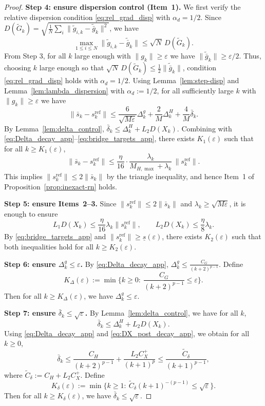 \documentclass[review,onefignum,onetabnum]{siamart171218}
\begin{document}
\begin{proof}
\smallskip
\noindent\textbf{Step 4: ensure dispersion control (Item~1).}
We first verify the relative dispersion condition \eqref{eq:rel_grad_disp} with $\alpha_d=1/2$.
Since $D(\tilde G_k)=\sqrt{\frac1N\sum_i\|\tilde g_{i,k}-\tilde{\bar g}_k\|^2}$, we have
\[
\max_{1\le i\le N}\|\tilde g_{i,k}-\tilde{\bar g}_k\|
\le \sqrt{N}\,D(\tilde G_k).
\]
From Step 3, for all $k$ large enough with $\|g_k\|\ge \varepsilon$ we have $\|\tilde{\bar g}_k\|\ge \varepsilon/2$.
Thus, choosing $k$ large enough so that $\sqrt N\,D(\tilde G_k)\le \frac12\|\tilde{\bar g}_k\|$,
condition \eqref{eq:rel_grad_disp} holds with $\alpha_d=1/2$.
Using Lemma~\ref{lem:step-disp} and Lemma~\ref{lem:lambda_dispersion} with $\alpha_d:=1/2$,
for all sufficiently large $k$ with $\|g_k\|\ge \varepsilon$ we have
\[
\|\bar s_k-s_k^{\mathrm{ref}}\|
\le \frac{6}{\sqrt{M\varepsilon}}\Delta_k^g+\frac{2}{M}\Delta_k^H+\frac{4}{M}\bar\delta_k.
\]
By Lemma~\ref{lem:delta_control}, $\bar\delta_k\le \Delta_k^H+L_2D(X_k)$.
Combining with \eqref{eq:Delta_decay_app}--\eqref{eq:bridge_targets_app}, there exists $K_1(\varepsilon)$ such that for all $k\ge K_1(\varepsilon)$,
\[
\|\bar s_k-s_k^{\mathrm{ref}}\|\le \frac{\eta}{16}\cdot \frac{\lambda_k}{M_{H,\max}+\lambda_k}\,\|s_k^{\mathrm{ref}}\|.
\]
This implies $\|s_k^{\mathrm{ref}}\|\le 2\|\bar s_k\|$ by the triangle inequality, and hence Item~1 of Proposition~\ref{prop:inexact-rn} holds.

\smallskip
\noindent\textbf{Step 5: ensure Items~2--3.}
Since $\|s_k^{\mathrm{ref}}\|\le 2\|\bar s_k\|$ and $\lambda_k\ge \sqrt{M\varepsilon}$, it is enough to ensure
\[
L_1D(X_k)\le \frac{\eta}{16}\lambda_k\|s_k^{\mathrm{ref}}\|,
\qquad
L_2D(X_k)\le \frac{\eta}{8}\lambda_k.
\]
By \eqref{eq:bridge_targets_app} and $\|s_k^{\mathrm{ref}}\|\ge \underline s(\varepsilon)$, there exists $K_2(\varepsilon)$ such that both inequalities hold for all $k\ge K_2(\varepsilon)$.

\smallskip
\noindent\textbf{Step 6: ensure $\Delta_k^g\le \varepsilon$.}
By \eqref{eq:Delta_decay_app}, $\Delta_k^g\le \frac{C_G}{(k+2)^{p-1}}$.
Define
\[
K_\Delta(\varepsilon):=\min\Big\{k\ge 0:\ \frac{C_G}{(k+2)^{p-1}}\le \varepsilon\Big\}.
\]
Then for all $k\ge K_\Delta(\varepsilon)$, we have $\Delta_k^g\le \varepsilon$.

\smallskip
\noindent\textbf{Step 7: ensure $\bar\delta_k\le \sqrt{\varepsilon}$.}
By Lemma~\ref{lem:delta_control}, we have for all $k$,
\[
\bar\delta_k\le \Delta_k^H + L_2D(X_k).
\]
Using \eqref{eq:Delta_decay_app} and \eqref{eq:DX_post_decay_app}, we obtain for all $k\ge 0$,
\[
\bar\delta_k
\le \frac{C_H}{(k+2)^{p-1}}+\frac{L_2C_X^{+}}{(k+1)^p}
\le \frac{\widetilde C_\delta}{(k+1)^{p-1}},
\]
where $\widetilde C_\delta:=C_H+L_2C_X^{+}$.
Define
\[
K_\delta(\varepsilon):=\min\Big\{k\ge 1:\ \widetilde C_\delta (k+1)^{-(p-1)}\le \sqrt{\varepsilon}\Big\}.
\]
Then for all $k\ge K_\delta(\varepsilon)$, we have $\bar\delta_k\le \sqrt{\varepsilon}$.


\end{proof}
\end{document}
